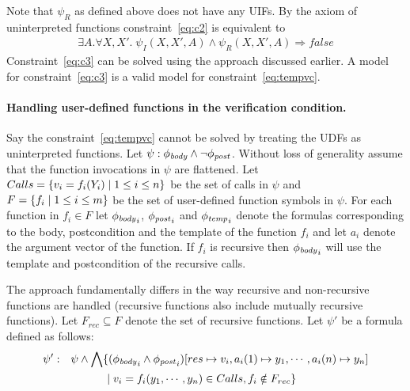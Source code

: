 \documentclass[a4paper,10pt]{article}
\begin{document}
Note that $\psi_R$ as defined above does not have any UIFs. By the axiom of uninterpreted functions constraint~\ref{eq:c2} is equivalent to 
%
\begin{align}
\exists A. \forall X,X'. \; \psi_{I}(X,X',A) \wedge \psi_{R}(X,X',A)  \Rightarrow false \label{eq:c3}
\end{align}
%
Constraint~\ref{eq:c3} can be solved using the approach discussed earlier. A model for constraint~\ref{eq:c3} is a valid model for constraint~\ref{eq:tempvc}.

\paragraph{Handling user-defined functions in the verification condition.}

Say the constraint~\ref{eq:tempvc} cannot be solved by treating the UDFs as uninterpreted functions. 
Let $\psi: \mathit{\phi_{body}} \wedge \neg \mathit{\phi_{post}}$. Without loss of generality assume that the function invocations in $\psi$ are flattened.
Let $Calls =\{ v_i = f_i(Y_i) \; | \; 1 \le i \le n \}$ be the set of calls in $\psi$ and
$F = \{ f_i \; | \; 1 \le i \le m \}$ be the set of user-defined function symbols in $\psi$. 
For each function in $f_i \in F$ let $\mathit{\phi_{body}}_i$, $\mathit{\phi_{post}}_i$ and $\mathit{\phi_{temp}}_i$ denote the formulas corresponding to the body, postcondition and the template of the function $f_i$ and let $a_i$ denote the argument vector of the function.
If $f_i$ is recursive then $\mathit{\phi_{body}}_i$ will use the template and postcondition of the recursive calls.

The approach fundamentally differs in the way recursive and non-recursive functions are handled (recursive functions also include mutually recursive functions).
Let $F_{rec} \subseteq F$ denote the set of recursive functions.
Let $\psi'$ be a formula defined as follows: 
%
\begin{align*}
\psi': & \quad \psi \wedge  \bigwedge \{ (\mathit{\phi_{body}}_i \wedge \mathit{\phi_{post}}_i)[res \mapsto v_i, a_i(1) \mapsto y_1,\cdots, a_i(n) \mapsto y_n] \\
	   & \qquad \qquad  \; | \; v_i = f_i(y_1,\cdots,y_n) \in Calls, f_i \notin F_{rec} \}
\end{align*}
\end{document}
